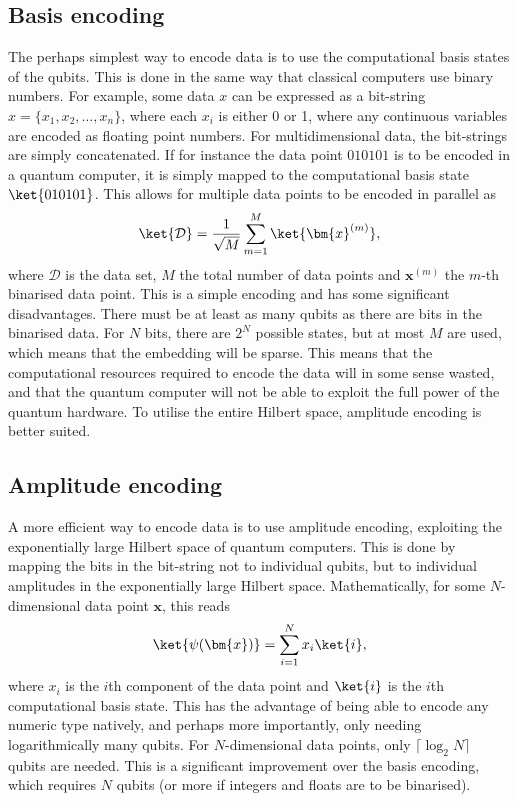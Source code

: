 \subsection{Basis encoding}
The perhaps simplest way to encode data is to use the computational basis states of the qubits.
This is done in the same way that classical computers use binary numbers.
For example, some data $x$ can be expressed as a bit-string $x = \{x_1, x_2, \dots, x_n\}$, where each $x_i$ is either 0 or 1, where any continuous variables are encoded as floating point numbers.
For multidimensional data, the bit-strings are simply concatenated.
% 
If for instance the data point $010101$ is to be encoded in a quantum computer, it is simply mapped to the computational basis state $\ket{010101}$.
This allows for multiple data points to be encoded in parallel as
\begin{equation}
    \ket{\mathcal{D}} = \frac{1}{\sqrt M} \sum_{m=1}^M \ket{\bm{x}^{(m)}},
\end{equation}
where $\mathcal{D}$ is the data set, $M$ the total number of data points and $\bm{x}^{(m)}$ the $m$-th binarised data point.
This is a simple encoding and has some significant disadvantages.
There must be at least as many qubits as there are bits in the binarised data.
For $N$ bits, there are $2^N$ possible states, but at most $M$ are used, which means that the embedding will be sparse.
This means that the computational resources required to encode the data will in some sense wasted, and that the quantum computer will not be able to exploit the full power of the quantum hardware.
To utilise the entire Hilbert space, amplitude encoding is better suited.

\subsection{Amplitude encoding}
A more efficient way to encode data is to use amplitude encoding, exploiting the exponentially large Hilbert space of quantum computers.
This is done by mapping the bits in the bit-string not to individual qubits, but to individual amplitudes in the exponentially large Hilbert space.
Mathematically, for some $N$-dimensional data point $\bm{x}$, this reads
\begin{equation}
    \ket{\psi(\bm{x})} = \sum_{i=1}^{N} x_i \ket{i},
\end{equation}
where $x_i$ is the $i$th component of the data point and $\ket{i}$ is the $i$th computational basis state.
This has the advantage of being able to encode any numeric type natively, and perhaps more importantly, only needing logarithmically many qubits.
For $N$-dimensional data points, only $\lceil \log_2 N \rceil$ qubits are needed.
This is a significant improvement over the basis encoding, which requires $N$ qubits (or more if integers and floats are to be binarised).

